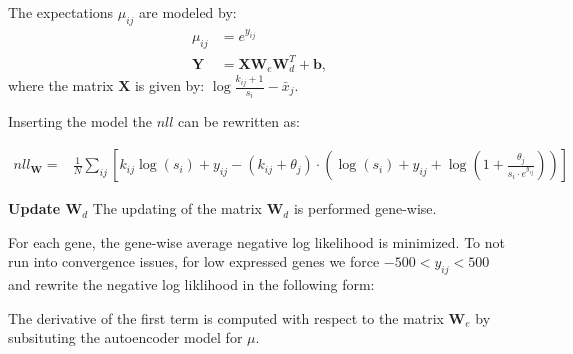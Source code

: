 \documentclass[11pt]{letter}
\newcommand{\matr}[1]{\mathbf{#1}}
\begin{document}
The expectations $\mu_{ij}$ are modeled by:
\begin{align*}
\mu_{ij} &= e^{y_{ij}} \\
\matr{Y} &= \matr{X} \matr{W}_e \matr{W}_d^T + \matr{b},
\end{align*}
where the matrix $\matr{X}$ is given by: $\log{\frac{k_{ij}+1}{s_i}} - \bar{x}_j$. 

Inserting the model the $nll$ can be rewritten as:

\begin{align*}
nll_{\matr{W}}=&  
\frac{1}{N} \sum_{ij} \left[ k_{ij} \log(s_i) + y_{ij} - (k_{ij} + \theta_j) \cdot \left( \log(s_i) + y_{ij} + \log(1 + \frac{\theta_j}{s_i \cdot e^{y_{ij}}}) \right) \right]
\end{align*}

\textbf{Update $\matr{W}_d$}
The updating of the matrix $\matr{W}_d$ is performed gene-wise.

For each gene, the gene-wise average negative log likelihood is minimized. 
To not run into convergence issues, for low expressed genes we force $-500 < y_{ij} < 500$ and rewrite the negative log liklihood in the following form:



The derivative of the first term is computed with respect to the matrix $\matr{W}_e$ by subsituting the autoencoder model for $\mu$. 

% 
\end{document}

